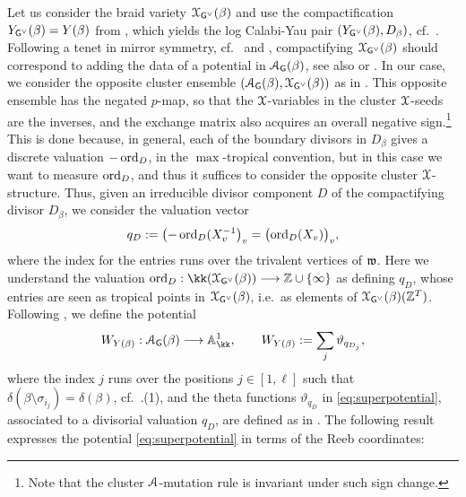 Let us consider the braid variety $\mathcal{X}_{\mathsf{G}^\vee}(\beta)$ and use the compactification $Y_{\mathsf{G}^\vee}(\beta)=Y(\beta)$ from , which yields the log Calabi-Yau pair $(Y_{\mathsf{G}^\vee}(\beta),D_\beta)$, cf.~. Following a tenet in mirror symmetry, cf.~\cite[Section 7.3]{HoriVafa} and \cite[Conjecture 1.1]{Auroux07_Tduality}, compactifying $\mathcal{X}_{\mathsf{G}^\vee}(\beta)$ should correspond to adding the data of a potential in $\mathcal{A}_{\mathsf{G}}(\beta)$, see also \cite[Section 1]{GHK15} or \cite[Section 5]{GHKK18}. In our case, we consider the opposite cluster ensemble $(\mathcal{A}_{\mathsf{G}}(\beta),\mathcal{X}_{\mathsf{G}^\vee}(\beta))$ as in \cite[Section 1.2]{FockGoncharov09_Dilog2}. This opposite ensemble has the negated $p$-map, so that the $\mathcal{X}$-variables in the cluster $\mathcal{X}$-seeds are the inverses, and the exchange matrix also acquires an overall negative sign.\footnote{Note that the cluster $\mathcal{A}$-mutation rule is invariant under such sign change.} This is done because, in general, each of the boundary divisors in $D_\beta$ gives a discrete valuation $-\operatorname{ord}_D$, in the $\max$-tropical convention, but in this case we want to measure $\operatorname{ord}_D$, and thus it suffices to consider the opposite cluster $\mathcal{X}$-structure. Thus, given an irreducible divisor component $D$ of the compactifying divisor $D_\beta$, we consider the valuation vector
\begin{equation}\label{eq:tropicallabel}
        q_D:=\bigl(-\operatorname{ord}_D(X_v^{-1}\bigr)_v
             =\bigl(\operatorname{ord}_D(X_v)\bigr)_v,
\end{equation}
where the index for the entries runs over the trivalent vertices of $\mathfrak{w}$. Here we understand the valuation $\ord_D:\kk(\SX_{\G^\vee}(\beta))\lr\Z\cup\{\infty\}$ as defining $q_D$, whose entries are seen as tropical points in $\mathcal{X}_{\mathsf{G}^\vee}(\beta)$, i.e.~as elements of $\mathcal{X}_{\mathsf{G}^\vee}(\beta)(\mathbb{Z}^T)$. Following \cite[Corollary 11.9]{GHKK18}, we define the potential
\begin{equation}\label{eq:superpotential}
W_{Y(\beta)}:\SA_\G(\beta)\lr\mathbb{A}^1_\kk, \qquad W_{Y(\beta)}:=\sum_{j}\tht_{q_{D_j}},
\end{equation}
where the index $j$ runs over the positions $j\in[1,\ell]$ such that $\delta(\beta\setminus \sigma_{i_j})=\delta(\beta)$, cf.~.(1), and the theta functions $\vartheta_{q_D}$ in \eqref{eq:superpotential}, associated to a divisorial valuation $q_D$, are defined as in \cite[Definition 3.3]{GHKK18}. The following result expresses the potential \eqref{eq:superpotential} in terms of the Reeb coordinates:

